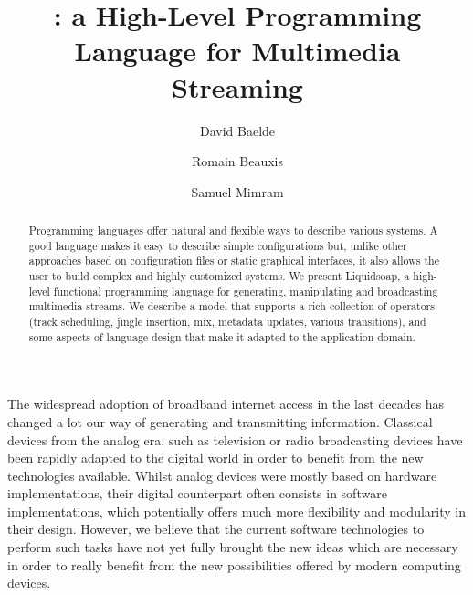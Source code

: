 \documentclass{llncs}
\title{\liquidsoap{}: a High-Level Programming Language for Multimedia Streaming}
\author{David Baelde\inst{1} \and Romain Beauxis\inst{2} \and Samuel Mimram\inst{3}}
\institute{
  ???
  \and
  ???
  \and
  CEA LIST -- LMeASI
}
\newcommand{\eg}{{e.g.}}
\begin{document}
\maketitle

\begin{abstract}
Programming languages offer natural and flexible ways to describe various
systems. A good language makes it easy to describe simple configurations but,
unlike other approaches based on configuration files or static graphical
interfaces, it also allows the user to build complex and highly customized systems.
We present Liquidsoap, a high-level functional programming
language for generating, manipulating and broadcasting multimedia streams. We
describe a model that supports a rich collection of operators (track scheduling,
jingle insertion, mix, metadata updates, various transitions), and some aspects
of language design that make it adapted to the application domain.
\end{abstract}

The widespread adoption of broadband internet access in the last decades has
changed a lot our way of generating and transmitting information. Classical
devices from the analog era, such as television or radio broadcasting devices
have been rapidly adapted to the digital world in order to benefit from the new
technologies available. Whilst analog devices were mostly based on hardware
implementations, their digital counterpart often consists in software
implementations,
which potentially offers much more flexibility and modularity in their design.
However, we believe that the current software technologies to perform such tasks
have not yet fully brought the new ideas which are necessary in order to really
benefit from the new possibilities offered by modern computing devices.
\end{document}
